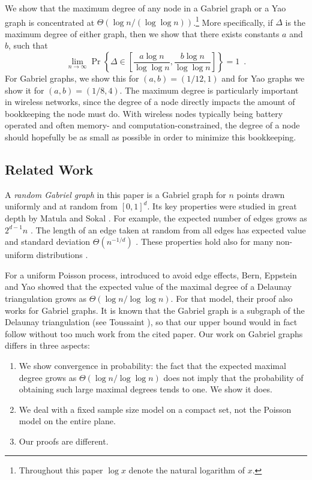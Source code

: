\documentclass[lotsofwhite,charterfonts]{patmorin}
\newcommand{\PROB}{\Pr}
\begin{document}
We show that the maximum degree of any node in a Gabriel
graph or a Yao graph is concentrated at $\Theta(\log n/(\log\log
n))$.\footnote{Throughout this paper $\log x$ denote the natural logarithm
of $x$.} More specifically, if $\Delta$ is the maximum degree of either
graph, then we show that there exists constants $a$ and $b$, such that
\[
    \lim_{n\rightarrow\infty}
       \PROB\left\{\Delta\in \left[\frac{a\log n}{\log\log n},
                         \frac{b\log n}{\log\log n}\right]\right\} = 1
       \enspace .
\]
For Gabriel graphs, we show this for $(a,b)=(1/12,1)$ and for Yao graphs
we show it for $(a,b)=(1/8,4)$.  The maximum degree is particularly
important in wireless networks, since the degree of a node directly impacts
the amount of bookkeeping the node must do.  With wireless nodes typically
being battery operated and often memory- and computation-constrained, the
degree of a node should hopefully be as small as possible in order to
minimize this bookkeeping.

\subsection{Related Work}

A \emph{random Gabriel graph} in this paper is a Gabriel graph for $n$
points drawn uniformly and at random from $[0,1]^d$.  Its key properties
were studied in great depth by Matula and Sokal \cite{ms80}.  For example,
the expected number of edges grows as $2^{d-1} n$ \cite{d88,ms80}.  The
length of an edge taken at random from all edges has expected value and
standard deviation $\Theta(n^{-1/d})$ \cite{d88}.  These properties hold
also for many non-uniform distributions \cite{d88}.  

For a uniform Poisson process, introduced to avoid edge effects,
Bern, Eppstein and Yao \cite{bey91} showed that the expected value of
the maximal degree of a Delaunay triangulation grows as $\Theta(\log
n/\log\log n)$.  For that model, their proof also works for Gabriel
graphs.  It is known that the Gabriel graph is a subgraph of the Delaunay
triangulation (see Toussaint \cite{t80b}), so that our upper bound would
in fact follow without too much work from the cited paper.  Our work on
Gabriel graphs differs in three aspects:

\begin{enumerate}
\item We show convergence in probability: the fact that the expected
maximal degree grows as $\Theta(\log n /\log \log n)$ does not imply that the
probability of obtaining such large maximal degrees tends to one. We
show it does.

\item We deal with a fixed sample size model on a compact set, not the
Poisson model on the entire plane.

\item Our proofs are different.
\end{enumerate}
\end{document}
